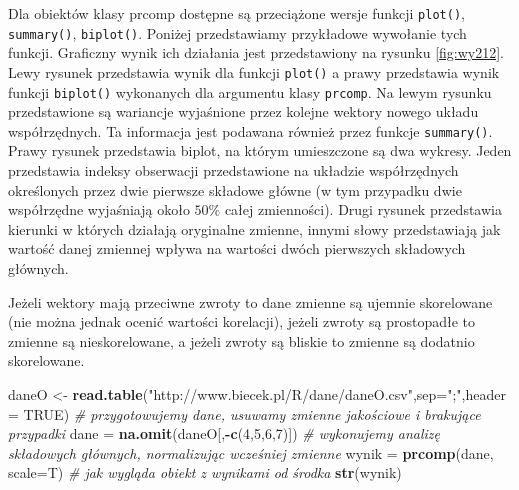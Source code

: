 \documentclass[polish,]{book}
\newenvironment{Shaded}{\begin{snugshade}}{\end{snugshade}}
\newcommand{\CommentTok}[1]{\textcolor[rgb]{0.56,0.35,0.01}{\textit{#1}}}
\newcommand{\DataTypeTok}[1]{\textcolor[rgb]{0.13,0.29,0.53}{#1}}
\newcommand{\DecValTok}[1]{\textcolor[rgb]{0.00,0.00,0.81}{#1}}
\newcommand{\KeywordTok}[1]{\textcolor[rgb]{0.13,0.29,0.53}{\textbf{#1}}}
\newcommand{\NormalTok}[1]{#1}
\newcommand{\OperatorTok}[1]{\textcolor[rgb]{0.81,0.36,0.00}{\textbf{#1}}}
\newcommand{\OtherTok}[1]{\textcolor[rgb]{0.56,0.35,0.01}{#1}}
\newcommand{\StringTok}[1]{\textcolor[rgb]{0.31,0.60,0.02}{#1}}
\begin{document}
Dla obiektów klasy prcomp dostępne są przeciążone wersje funkcji \texttt{plot()}, \texttt{summary()},
\texttt{biplot()}. Poniżej przedstawiamy przykładowe wywołanie tych funkcji. Graficzny
wynik ich działania jest przedstawiony na rysunku \ref{fig:wy212}. Lewy rysunek przedstawia
wynik dla funkcji \texttt{plot()} a prawy przedstawia wynik funkcji \texttt{biplot()} wykonanych
dla argumentu klasy \texttt{prcomp}. Na lewym rysunku przedstawione są wariancje wyjaśnione przez kolejne wektory nowego układu współrzędnych. Ta informacja jest
podawana również przez funkcje \texttt{summary()}. Prawy rysunek przedstawia biplot, na
którym umieszczone są dwa wykresy. Jeden przedstawia indeksy obserwacji przedstawione na układzie współrzędnych określonych przez dwie pierwsze składowe główne
(w tym przypadku dwie współrzędne wyjaśniają około \(50\%\) całej zmienności). Drugi
rysunek przedstawia kierunki w których działają oryginalne zmienne, innymi słowy
przedstawiają jak wartość danej zmiennej wpływa na wartości dwóch pierwszych
składowych głównych.

Jeżeli wektory mają przeciwne zwroty to dane zmienne są ujemnie skorelowane
(nie można jednak ocenić wartości korelacji), jeżeli zwroty są prostopadłe to zmienne są nieskorelowane, a jeżeli zwroty są bliskie to zmienne są dodatnio skorelowane.

\begin{Shaded}
\begin{Highlighting}[]
\NormalTok{daneO <-}\StringTok{ }\KeywordTok{read.table}\NormalTok{(}\StringTok{"http://www.biecek.pl/R/dane/daneO.csv"}\NormalTok{,}\DataTypeTok{sep=}\StringTok{";"}\NormalTok{,}\DataTypeTok{header =} \OtherTok{TRUE}\NormalTok{)}
\CommentTok{# przygotowujemy dane, usuwamy zmienne jakościowe i brakujące przypadki}
\NormalTok{dane =}\StringTok{ }\KeywordTok{na.omit}\NormalTok{(daneO[,}\OperatorTok{-}\KeywordTok{c}\NormalTok{(}\DecValTok{4}\NormalTok{,}\DecValTok{5}\NormalTok{,}\DecValTok{6}\NormalTok{,}\DecValTok{7}\NormalTok{)])}
\CommentTok{# wykonujemy analizę składowych głównych, normalizując wcześniej zmienne}
\NormalTok{wynik =}\StringTok{ }\KeywordTok{prcomp}\NormalTok{(dane, }\DataTypeTok{scale=}\NormalTok{T)}
\CommentTok{# jak wygląda obiekt z wynikami od środka}
\KeywordTok{str}\NormalTok{(wynik)}
\end{Highlighting}
\end{Shaded}
\end{document}
